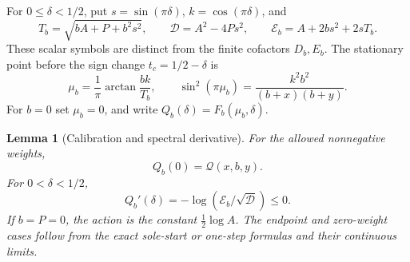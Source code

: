 \documentclass[11pt]{article}
\numberwithin{equation}{section}
\newtheorem{lemma}[theorem]{Lemma}
\theoremstyle{remark}\newtheorem{remark}[theorem]{Remark}
\begin{document}
For \(0\le\delta<1/2\), put \(s=\sin(\pi\delta)\), \(k=\cos(\pi\delta)\),
and
\[
 T_b=\sqrt{bA+P+b^2s^2},\qquad
 \mathcal D=A^2-4Ps^2,\qquad
 \mathcal E_b=A+2bs^2+2sT_b.
\]
These scalar symbols are distinct from the finite cofactors \(D_b,E_b\).
The stationary point before the sign change \(t_c=1/2-\delta\) is
\begin{equation}\label{lc:mu}
 \mu_b=\frac1\pi\arctan\frac{bk}{T_b},\qquad
 \sin^2(\pi\mu_b)=\frac{k^2b^2}{(b+x)(b+y)}.
\end{equation}
For \(b=0\) set \(\mu_b=0\), and write
\(Q_b(\delta)=F_b(\mu_b,\delta)\).

\begin{lemma}[Calibration and spectral derivative]\label{lc:action-identity}
For the allowed nonnegative weights,
\begin{equation}\label{lc:calibration}
                       Q_b(0)=\mathcal Q(x,b,y).
\end{equation}
For \(0<\delta<1/2\),
\begin{equation}\label{lc:action-derivative}
             Q_b'(\delta)=-\log(\mathcal E_b/\sqrt{\mathcal D})\le0.
\end{equation}
If \(b=P=0\), the action is the constant \(\frac12\log A\).
The endpoint and zero-weight cases follow from the exact sole-start
or one-step formulas and their continuous limits.
\end{lemma}
\end{document}
